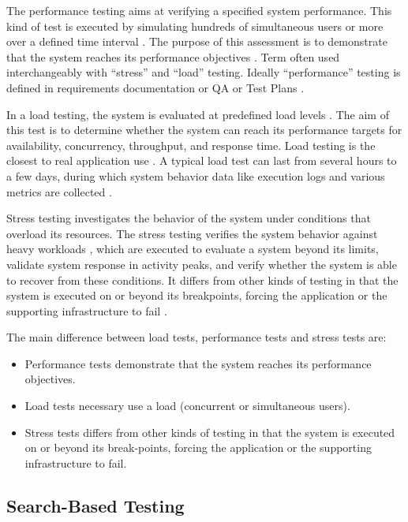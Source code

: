 \documentclass[espaco=umemeio,chapter=TITLE,twoside,openright]{abnt}
\begin{document}
The performance testing aims at verifying a specified system performance. This kind of test is executed by simulating hundreds of simultaneous users or more over a defined time interval \cite{DiLucca2006}. The purpose of this assessment is to demonstrate that the system reaches its performance objectives \cite{Sandler2004}.  Term often used interchangeably with “stress” and “load” testing. Ideally “performance” testing is defined in requirements documentation or QA or Test Plans \cite{Lewis2005}.


In a load testing, the system is evaluated at predefined load levels \cite{DiLucca2006}. The aim of this test is to determine whether the system can reach its performance targets for availability, concurrency, throughput, and response time. Load testing is the closest to real application use \cite{Molyneaux2009}. A typical load test can last from several hours to a few days, during which system behavior data like execution logs and various metrics are collected \cite{Afzal2009a}.

Stress testing investigates the behavior of the system under conditions
that overload its resources. The stress testing verifies the system behavior against heavy workloads \cite{Sandler2004} \cite{Lewis2005}, which are executed to evaluate a system beyond its limits, validate system response in activity peaks, and verify whether the system is able to recover from these conditions. It differs from other kinds of testing in that the system is executed on or beyond its breakpoints, forcing the application or the supporting infrastructure to fail \cite{DiLucca2006} \cite{Molyneaux2009}.

The main difference between load tests, performance tests and stress tests are:

\begin{itemize}

\item Performance tests demonstrate that the system reaches its performance objectives.
\item Load tests necessary use a load (concurrent or simultaneous users).
\item Stress tests differs from other kinds of testing in that the system is executed on or beyond its break-points, forcing the application or the supporting infrastructure to fail.
\end{itemize}


\subsection{Search-Based Testing}
\end{document}

